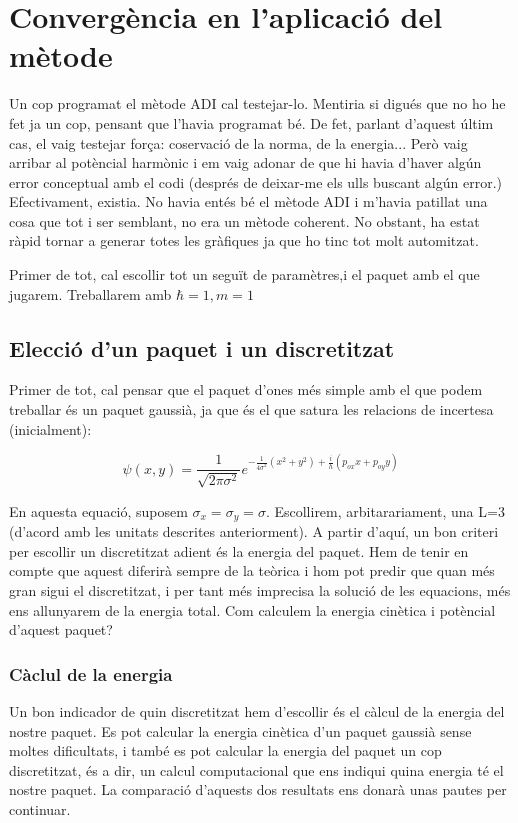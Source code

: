 \documentclass{article}
\begin{document}
\section{Convergència en l'aplicació del mètode}

Un cop programat el mètode ADI cal testejar-lo. Mentiria si digués que no ho he fet ja un cop, pensant que l'havia programat bé. De fet, parlant d'aquest últim cas, el vaig testejar força: coservació de la norma, de la energia... Però vaig arribar al potèncial harmònic i em  vaig adonar de que hi havia d'haver algún error conceptual amb el codi (després de deixar-me els ulls buscant algún error.) Efectivament, existia. No havia entés bé el mètode ADI i m'havia patillat una cosa que tot i ser semblant, no era un mètode coherent. No obstant, ha estat ràpid tornar a generar totes les gràfiques ja que ho tinc tot molt automitzat.

Primer de tot, cal escollir tot un seguït de paramètres,i el paquet amb el que jugarem. Treballarem amb \(\hbar=1,m=1\)

\subsection{Elecció d'un paquet i un discretitzat}

Primer de tot, cal pensar que el paquet d'ones més simple amb el que podem treballar és un paquet gaussià, ja que és el que satura les relacions de incertesa (inicialment):

\begin{equation}
\psi(x,y)=\frac{1}{\sqrt{2\pi\sigma^2}}e^{-\frac{1}{4\sigma^2} (x^2+y^2)+\frac{i}{h} (p_{ox} x +p_{oy} y)}	
\end{equation}

En aquesta equació, suposem \(\sigma_x=\sigma_y=\sigma\). Escollirem, arbitarariament, una L=3 (d'acord amb les unitats descrites anteriorment). A partir d'aquí, un bon criteri per escollir un discretitzat adient és la energia del paquet. Hem de tenir en compte que aquest diferirà sempre de la teòrica i hom pot predir que quan més gran sigui el discretitzat, i per tant més imprecisa la solució de les equacions, més ens allunyarem de la energia total. Com calculem la energia cinètica i potèncial d'aquest paquet?

\subsubsection{Càclul de la energia}
Un bon indicador de quin discretitzat hem d'escollir és el càlcul de la energia del nostre paquet. Es pot calcular la energia cinètica d'un paquet gaussià sense moltes dificultats, i també es pot calcular la energia del paquet un cop discretitzat, és a dir, un calcul computacional que ens indiqui quina energia té el nostre paquet. La comparació d'aquests dos resultats ens donarà unas pautes per continuar. 
\end{document}
